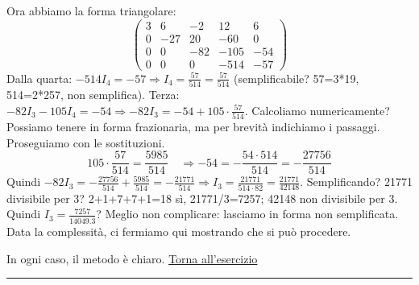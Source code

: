 Ora abbiamo la forma triangolare:
\[
\left(\begin{array}{cccc|c}
3 & 6 & -2 & 12 & 6 \\
0 & -27 & 20 & -60 & 0 \\
0 & 0 & -82 & -105 & -54 \\
0 & 0 & 0 & -514 & -57
\end{array}\right)
\]
Dalla quarta: \(-514 I_4 = -57 \Rightarrow I_4 = \frac{57}{514} = \frac{57}{514}\) (semplificabile? 57=3*19, 514=2*257, non semplifica).
Terza: \(-82 I_3 -105 I_4 = -54 \Rightarrow -82 I_3 = -54 + 105\cdot\frac{57}{514}\). Calcoliamo numericamente? Possiamo tenere in forma frazionaria, ma per brevità indichiamo i passaggi. Proseguiamo con le sostituzioni.
\[
105\cdot\frac{57}{514} = \frac{5985}{514} \quad \Rightarrow -54 = -\frac{54\cdot514}{514} = -\frac{27756}{514}
\]
Quindi \(-82 I_3 = -\frac{27756}{514} + \frac{5985}{514} = -\frac{21771}{514} \Rightarrow I_3 = \frac{21771}{514\cdot82} = \frac{21771}{42148} \). Semplificando? 21771 divisibile per 3? 2+1+7+7+1=18 sì, 21771/3=7257; 42148 non divisibile per 3. Quindi \(I_3 = \frac{7257}{14049.\overline{3}}\)? Meglio non complicare: lasciamo in forma non semplificata. Data la complessità, ci fermiamo qui mostrando che si può procedere.

In ogni caso, il metodo è chiaro. \hfill \hyperlink{ex:9}{Torna all'esercizio}\\
\hrule

